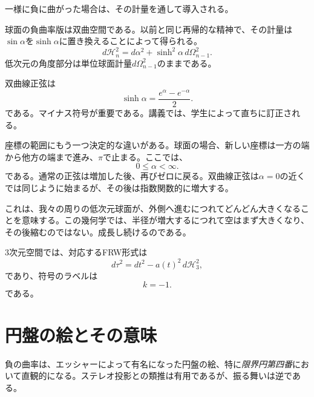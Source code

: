 一様に負に曲がった場合は、その計量を通して導入される。

球面の負曲率版は双曲空間である。以前と同じ再帰的な精神で、その計量は\(\sin\alpha\)を\(\sinh\alpha\)に置き換えることによって得られる。
\begin{equation}
d\mathcal H_n^2=d\alpha^2+\sinh^2\alpha\,d\Omega_{n-1}^2.
\end{equation}
低次元の角度部分は単位球面計量\(d\Omega_{n-1}^2\)のままである。

\begin{classroomqa}
\end{classroomqa}

双曲線正弦は
\begin{equation}
\sinh\alpha=\frac{e^\alpha-e^{-\alpha}}{2}.
\end{equation}
である。マイナス符号が重要である。講義では、学生によって直ちに訂正される。

座標の範囲にもう一つ決定的な違いがある。球面の場合、新しい座標は一方の端から他方の端まで進み、\(\pi\)で止まる。ここでは、
\begin{equation}
0\leq \alpha<\infty.
\end{equation}
である。通常の正弦は増加した後、再びゼロに戻る。双曲線正弦は\(\alpha=0\)の近くでは同じように始まるが、その後は指数関数的に増大する。

これは、我々の周りの低次元球面が、外側へ進むにつれてどんどん大きくなることを意味する。この幾何学では、半径が増大するにつれて空はまず大きくなり、その後縮むのではない。成長し続けるのである。

3次元空間では、対応するFRW形式は
\begin{equation}
d\tau^2=dt^2-a(t)^2\,d\mathcal H_3^2,
\end{equation}
であり、符号のラベルは
\begin{equation}
k=-1.
\end{equation}
である。

\section{円盤の絵とその意味}

負の曲率は、エッシャーによって有名になった円盤の絵、特に\emph{限界円第四番}において直観的になる。ステレオ投影との類推は有用であるが、振る舞いは逆である。


